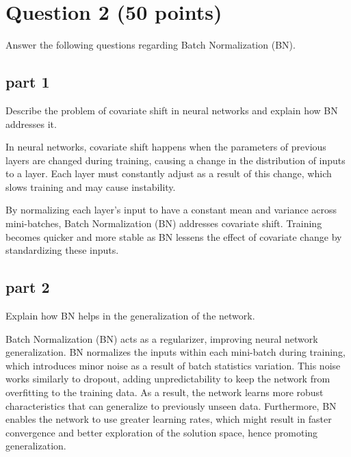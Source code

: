 \section{Question 2 (50 points)} 
Answer the following questions regarding Batch Normalization (BN).
\subsection{part 1}
Describe the problem of covariate shift in neural networks and explain how BN addresses it.
\begin{qsolve}
    \begin{qsolve}[]
        In neural networks, covariate shift happens when the parameters of previous layers are changed during training, causing a change in the distribution of inputs to a layer. Each layer must constantly adjust as a result of this change, which slows training and may cause instability.

        By normalizing each layer's input to have a constant mean and variance across mini-batches, Batch Normalization (BN) addresses covariate shift. Training becomes quicker and more stable as BN lessens the effect of covariate change by standardizing these inputs.
    \end{qsolve}
\end{qsolve}
\subsection{part 2}
Explain how BN helps in the generalization of the network.
\begin{qsolve}
    \begin{qsolve}[]
        Batch Normalization (BN) acts as a regularizer, improving neural network generalization. BN normalizes the inputs within each mini-batch during training, which introduces minor noise as a result of batch statistics variation. This noise works similarly to dropout, adding unpredictability to keep the network from overfitting to the training data. As a result, the network learns more robust characteristics that can generalize to previously unseen data. Furthermore, BN enables the network to use greater learning rates, which might result in faster convergence and better exploration of the solution space, hence promoting generalization.

    \end{qsolve}
\end{qsolve}
